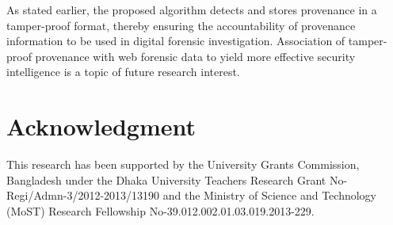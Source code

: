 \documentclass[conference]{IEEEtran}
\begin{document}
As stated earlier, the proposed algorithm detects and stores provenance in a tamper-proof format, thereby ensuring the accountability of provenance information to be used in digital forensic investigation. Association of tamper-proof provenance with web forensic data to yield more effective security intelligence is a topic of future research interest.


\section*{Acknowledgment}
This research has been supported by the University Grants Commission, Bangladesh under the Dhaka University Teachers Research Grant No-Regi/Admn-3/2012-2013/13190 and the Ministry of Science and Technology (MoST) Research Fellowship No-39.012.002.01.03.019.2013-229.
\end{document}
